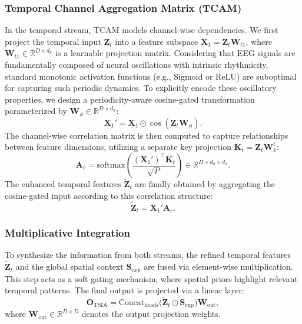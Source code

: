 \documentclass[journal]{IEEEtran}
\theoremstyle{plain}
\begin{document}
\subsubsection{Temporal Channel Aggregation Matrix (TCAM)}
In the temporal stream, TCAM models channel-wise dependencies. We first project the temporal input $\mathbf{Z}_t$ into a feature subspace $\mathbf{X}_1 = \mathbf{Z}_t \mathbf{W}_{t1}$, where $\mathbf{W}_{t1} \in \mathbb{R}^{D \times d_h}$ is a learnable projection matrix. Considering that EEG signals are fundamentally composed of neural oscillations with intrinsic rhythmicity, standard monotonic activation functions (e.g., Sigmoid or ReLU) are suboptimal for capturing such periodic dynamics. To explicitly encode these oscillatory properties, we design a periodicity-aware cosine-gated transformation parameterized by $\mathbf{W}_\phi \in \mathbb{R}^{D \times d_h}$:
\begin{equation}
\mathbf{X}_1' = \mathbf{X}_1 \odot \cos(\mathbf{Z}_t \mathbf{W}_\phi).
\end{equation}
The channel-wise correlation matrix is then computed to capture relationships between feature dimensions, utilizing a separate key projection $\mathbf{K}_t = \mathbf{Z}_t \mathbf{W}_{k}^t$:
\begin{equation}
\mathbf{A}_{c} = \text{softmax}\left(\frac{(\mathbf{X}_1')^\top \mathbf{K}_t}{\sqrt{P}}\right) \in \mathbb{R}^{H \times d_h \times d_h}.
\end{equation}
The enhanced temporal features $\widetilde{\mathbf{Z}}_t$ are finally obtained by aggregating the cosine-gated input according to this correlation structure:
\begin{equation}
\widetilde{\mathbf{Z}}_t = \mathbf{X}_1' \mathbf{A}_{c}.
\end{equation}

\subsubsection{Multiplicative Integration}
To synthesize the information from both streams, the refined temporal features $\widetilde{\mathbf{Z}}_t$ and the global spatial context $\mathbf{S}_{exp}$ are fused via element-wise multiplication. This step acts as a soft gating mechanism, where spatial priors highlight relevant temporal patterns. The final output is projected via a linear layer:
\begin{equation}
\mathbf{O}_{\text{TSIA}} = \text{Concat}_{\text{heads}}\big(\widetilde{\mathbf{Z}}_t \odot \mathbf{S}_{\text{exp}}\big)\mathbf{W}_{\text{out}},
\label{eq:tsia_output}
\end{equation}
where $\mathbf{W}_{\text{out}} \in \mathbb{R}^{D \times D}$ denotes the output projection weights.
\end{document}
